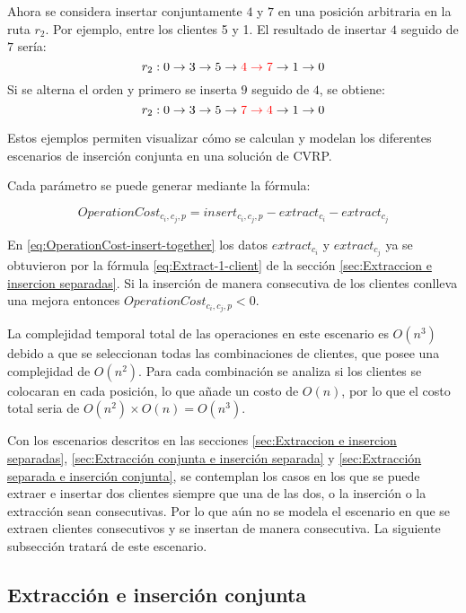 \documentclass[12pt]{report}
\begin{document}
	Ahora se considera insertar conjuntamente $4$ y $7$ en una posición arbitraria en la ruta $r_2 $. Por ejemplo, entre los clientes 5 y 1. El resultado de insertar $4$ seguido de $7$ sería:
	\[
	r_2: 0 \rightarrow 3 \rightarrow 5 \rightarrow \textcolor{red}{4 \rightarrow 7} \rightarrow 1 \rightarrow 0
	\]
	Si se alterna el orden y primero se inserta \(9\) seguido de \(4\), se obtiene:
	\[
	r_2: 0 \rightarrow 3 \rightarrow 5 \rightarrow \textcolor{red}{7 \rightarrow 4} \rightarrow 1 \rightarrow 0
	\]

	Estos ejemplos permiten visualizar cómo se calculan y modelan los diferentes escenarios de inserción conjunta en una solución de CVRP.

	Cada parámetro se puede generar mediante la fórmula:

	\begin{equation}
		OperationCost_{c_i,c_j,p} = insert_{c_i,c_j,p} - extract_{c_i} - extract_{c_j}
		\label{eq:OperationCost-insert-together}
	\end{equation}

	En \ref{eq:OperationCost-insert-together} los datos $extract_{c_i}$ y $extract_{c_j}$ ya se obtuvieron por la fórmula \ref{eq:Extract-1-client} de la sección \ref{sec:Extraccion e insercion separadas}.
	Si la inserción de manera consecutiva de los clientes conlleva una mejora entonces $OperationCost_{c_i,c_j,p} < 0$.

	La complejidad temporal total de las operaciones en este escenario es $O(n^3)$ debido a que se seleccionan todas las combinaciones de clientes, que posee una complejidad de $O(n^2)$. Para cada combinación se analiza si los clientes se colocaran en cada posición, lo que añade un costo de $O(n)$, por lo que el costo total seria de $O(n^2) \times O(n) = O(n^3)$.

	Con los escenarios descritos en las secciones \ref{sec:Extraccion e insercion separadas}, \ref{sec:Extracción conjunta e inserción separada} y \ref{sec:Extracción separada e inserción conjunta}, se contemplan los casos en los que se puede extraer e insertar dos clientes siempre que una de las dos, o la inserción o la extracción sean consecutivas. Por lo que aún no se modela el escenario en que se extraen clientes consecutivos y se insertan de manera consecutiva. La siguiente subsección tratará de este escenario.

	\subsection{Extracción e inserción conjunta}
	\label{sec:Extracción e inserción conjunta}
\end{document}
